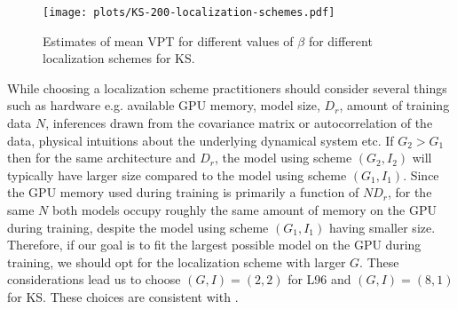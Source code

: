 \begin{figure}[!htp]
    \centering
    \texttt{[image: plots/KS-200-localization-schemes.pdf]}
    \caption{Estimates of mean VPT for different values of $\beta$ for different localization schemes for KS.}
    \label{fig:KS-loc}
\end{figure}

While choosing a localization scheme practitioners should consider several things such as hardware e.g. available GPU memory, model size, $D_r$, amount of training data $N$, inferences drawn from the covariance matrix or autocorrelation of the data, physical intuitions about the underlying dynamical system etc. If $G_2>G_1$ then for the same architecture and $D_r$, the model using scheme $(G_2, I_2)$ will typically have larger size compared to the model using scheme $(G_1, I_1)$. Since the GPU memory used during training is primarily a function of  $ND_r$,  for the same $N$ both models occupy roughly the same amount of memory on the GPU during training, despite the model using scheme $(G_1, I_1)$ having smaller size. Therefore, if our goal is to fit the largest possible model on the GPU during training, we should opt for the localization scheme with larger $G$. These considerations lead us to choose $(G, I)=(2, 2)$ for L96 and $(G, I)=(8, 1)$ for KS. These choices are consistent with \cite{platt2022systematic, vlachas2020backpropagation}.
